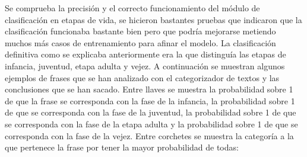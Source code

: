 Se comprueba la precisión y el correcto funcionamiento del módulo de clasificación en etapas de vida, se hicieron bastantes pruebas que indicaron que la clasificación funcionaba bastante bien pero que podría mejorarse metiendo muchos más casos de entrenamiento para afinar el modelo. La clasificación definitiva como se explicaba anteriormente era la que distinguía las etapas de infancia, juventud, etapa adulta y vejez. A continuación se muestran algunos ejemplos de frases que se han analizado con el categorizador de textos y las conclusiones que se han sacado. Entre llaves se muestra la probabilidad sobre 1 de que la frase se corresponda con la fase de la infancia, la probabilidad sobre 1 de que se corresponda con la fase de la juventud, la probabilidad sobre 1 de que se corresponda con la fase de la etapa adulta y la probabilidad sobre 1 de que se corresponda con la fase de la vejez. Entre corchetes se muestra la categoría a la que pertenece la frase por tener la mayor probabilidad de todas:

